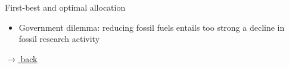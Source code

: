 \documentclass[11pt,aspectratio=169]{beamer}
\begin{document}
\begin{frame}{First-best and optimal allocation}
\begin{figure}[h!!]
\begin{subfigure}{0.45\textwidth}
		\end{subfigure}
	\end{figure}
	\vspace{1mm}
	\begin{block}{}
		\begin{itemize}
			\item {Government dilemma: reducing fossil fuels entails too strong a decline in fossil research activity}
		\end{itemize}
	\end{block}	
	\vspace{-5.7mm}
	\hfill
	\hyperlink{backop}{\tiny{$\rightarrow$ back}}
\end{frame}	
	
\end{document}

